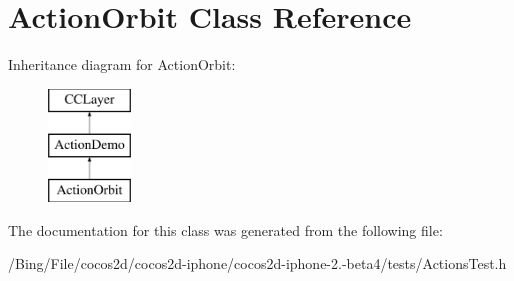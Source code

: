 \hypertarget{interface_action_orbit}{\section{Action\-Orbit Class Reference}
\label{interface_action_orbit}
}
Inheritance diagram for Action\-Orbit\-:\begin{figure}[H]
\begin{center}
\leavevmode
\includegraphics[height=3.000000cm]{interface_action_orbit}
\end{center}
\end{figure}


The documentation for this class was generated from the following file\-:\begin{DoxyCompactItemize}
\item 
/\-Bing/\-File/cocos2d/cocos2d-\/iphone/cocos2d-\/iphone-\/2.-\/beta4/tests/Actions\-Test.\-h\end{DoxyCompactItemize}
